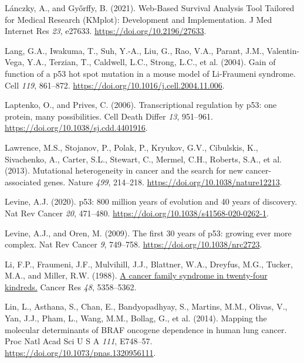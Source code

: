 \begin{CSLReferences}{0}{0}
\leavevmode{}%
Lánczky, A., and Győrffy, B. (2021). Web-Based Survival Analysis Tool Tailored for Medical Research (KMplot): Development and Implementation. J Med Internet Res \emph{23}, e27633. \url{https://doi.org/10.2196/27633}.

\leavevmode{}%
Lang, G.A., Iwakuma, T., Suh, Y.-A., Liu, G., Rao, V.A., Parant, J.M., Valentin-Vega, Y.A., Terzian, T., Caldwell, L.C., Strong, L.C., et al. (2004). Gain of function of a p53 hot spot mutation in a mouse model of Li-Fraumeni syndrome. Cell \emph{119}, 861--872. \url{https://doi.org/10.1016/j.cell.2004.11.006}.

\leavevmode{}%
Laptenko, O., and Prives, C. (2006). Transcriptional regulation by p53: one protein, many possibilities. Cell Death Differ \emph{13}, 951--961. \url{https://doi.org/10.1038/sj.cdd.4401916}.

\leavevmode{}%
Lawrence, M.S., Stojanov, P., Polak, P., Kryukov, G.V., Cibulskis, K., Sivachenko, A., Carter, S.L., Stewart, C., Mermel, C.H., Roberts, S.A., et al. (2013). Mutational heterogeneity in cancer and the search for new cancer-associated genes. Nature \emph{499}, 214--218. \url{https://doi.org/10.1038/nature12213}.

\leavevmode{}%
Levine, A.J. (2020). p53: 800 million years of evolution and 40 years of discovery. Nat Rev Cancer \emph{20}, 471--480. \url{https://doi.org/10.1038/s41568-020-0262-1}.

\leavevmode{}%
Levine, A.J., and Oren, M. (2009). The first 30 years of p53: growing ever more complex. Nat Rev Cancer \emph{9}, 749--758. \url{https://doi.org/10.1038/nrc2723}.

\leavevmode{}%
Li, F.P., Fraumeni, J.F., Mulvihill, J.J., Blattner, W.A., Dreyfus, M.G., Tucker, M.A., and Miller, R.W. (1988). \href{https://www.ncbi.nlm.nih.gov/pubmed/3409256}{A cancer family syndrome in twenty-four kindreds.} Cancer Res \emph{48}, 5358--5362.

\leavevmode{}%
Lin, L., Asthana, S., Chan, E., Bandyopadhyay, S., Martins, M.M., Olivas, V., Yan, J.J., Pham, L., Wang, M.M., Bollag, G., et al. (2014). Mapping the molecular determinants of BRAF oncogene dependence in human lung cancer. Proc Natl Acad Sci U S A \emph{111}, E748--57. \url{https://doi.org/10.1073/pnas.1320956111}.


\end{CSLReferences}
